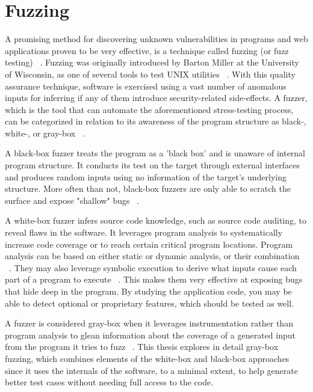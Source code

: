 \section{Fuzzing}
A promising method for discovering unknown vulnerabilities in programs and web applications proven to be very effective, is a technique called fuzzing (or fuzz testing) ~\cite{fuzzing_def}. Fuzzing was originally introduced by Barton Miller at the University of Wisconsin, as one of several tools to test UNIX utilities ~\cite{mller1990fuzz}. With this quality assurance technique, software is exercised using a vast number of anomalous inputs for inferring if any of them introduce security-related side-effects. A fuzzer, which is the tool that can automate the aforementioned stress-testing process, can be categorized in relation to its awareness of the program structure as black-, white-, or gray-box ~\cite{fuzzing_book}. 

A black-box fuzzer treats the program as a 'black box' and is unaware of
internal program structure. It conducts its test on the target through external
interfaces and produces random inputs using no information of the target's underlying structure. More often than not, black-box fuzzers are only able to scratch the surface and expose "shallow" bugs ~\cite{fuzzing_owasp}. 

A white-box fuzzer infers source code knowledge, such as source code auditing, to reveal
flaws in the software. It leverages program analysis to systematically
increase code coverage or to reach certain critical program locations. Program analysis can be based on either static or dynamic analysis, or their combination ~\cite{program_analysis_book}. They may also leverage symbolic execution to derive what inputs cause each part of a program to execute ~\cite{symbolic_exe}. This makes them very effective at exposing bugs that hide deep in the program. By studying the application code, you may be able to detect optional or proprietary features, which should be tested as well.

A fuzzer is considered gray-box when it leverages instrumentation rather than program analysis to glean information about the coverage of a generated input from the program it tries to fuzz ~\cite{zalewski2015american,efs2007}. This thesis explores in detail gray-box fuzzing, which combines elements of the white-box and black-box approaches since it uses the internals of the software, to a minimal extent, to help generate better test cases without needing full access to the code. 

